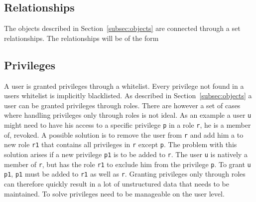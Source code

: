 \subsection{Relationships}
The objects described in Section~\ref{subsec:objects} are connected through a set relationships.
The relationships will be of the form

\subsection{Privileges}
A user is granted privileges through a whitelist.
Every privilege not found in a users whitelist is implicitly blacklisted.
As described in Section~\ref{subsec:objects} a user can be granted privileges through roles.
There are however a set of cases where handling privileges only through roles is not ideal.
As an example a user \verb+u+ might need to have his access to a specific privilege \verb+p+ in a role \verb+r+, he is a member of, revoked.
A possible solution is to remove the user from \verb+r+ and add him a to new role \verb+r1+ that contains all privileges in \verb+r+ except \verb+p+.
The problem with this solution arises if a new privilege \verb+p1+ is to be added to \verb+r+.
The user \verb+u+ is natively a member of \verb+r+, but has the role \verb+r1+ to exclude him from the privilege \verb+p+.
To grant \verb+u+ \verb+p1+, \verb+p1+ must be added to \verb+r1+ as well as \verb+r+.
Granting privileges only through roles can therefore quickly result in a lot of unstructured data that needs to be maintained.
To solve privileges need to be manageable on the user level.


